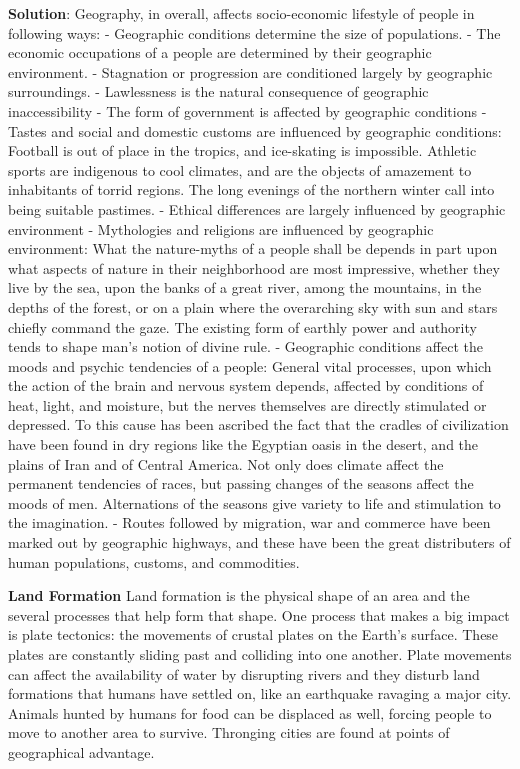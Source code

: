 \documentclass[
]{book}
\newenvironment{solution}{ {\bfseries Solution}:}{}
\begin{document}
\begin{questions}
\begin{solution}
Geography, in overall, affects socio-economic lifestyle of people in following ways:
- Geographic conditions determine the size of populations.
- The economic occupations of a people are determined by their geographic environment.
- Stagnation or progression are conditioned largely by geographic surroundings.
- Lawlessness is the natural consequence of geographic inaccessibility
- The form of government is affected by geographic conditions
- Tastes and social and domestic customs are influenced by geographic conditions: Football is out of place in the tropics, and ice-skating is impossible. Athletic sports are indigenous to cool climates, and are the objects of amazement to inhabitants of torrid regions. The long evenings of the northern winter call into being suitable pastimes.
- Ethical differences are largely influenced by geographic environment
- Mythologies and religions are influenced by geographic environment: What the nature-myths of a people shall be depends in part upon what aspects of nature in their neighborhood are most impressive, whether they live by the sea, upon the banks of a great river, among the mountains, in the depths of the forest, or on a plain where the overarching sky with sun and stars chiefly command the gaze. The existing form of earthly power and authority tends to shape man's notion of divine rule.
- Geographic conditions affect the moods and psychic tendencies of a people:  General vital processes, upon which the action of the brain and nervous system depends, affected by conditions of heat, light, and moisture, but the nerves themselves are directly stimulated or depressed. To this cause has been ascribed the fact that the cradles of civilization have been found in dry regions like the Egyptian oasis in the desert, and the plains of Iran and of Central America. Not only does climate affect the permanent tendencies of races, but passing changes of the seasons affect the moods of men. Alternations of the seasons give variety to life and stimulation to the imagination.
- Routes followed by migration, war and commerce have been marked out by geographic highways, and these have been the great distributers of human populations, customs, and commodities.

\textbf{Land Formation}
Land formation is the physical shape of an area and the several processes that help form that shape. One process that makes a big impact is plate tectonics: the movements of crustal plates on the Earth's surface. These plates are constantly sliding past and colliding into one another. Plate movements can affect the availability of water by disrupting rivers and they disturb land formations that humans have settled on, like an earthquake ravaging a major city. Animals hunted by humans for food can be displaced as well, forcing people to move to another area to survive. Thronging cities are found at points of geographical advantage.


\end{solution}
\end{questions}
\end{document}
